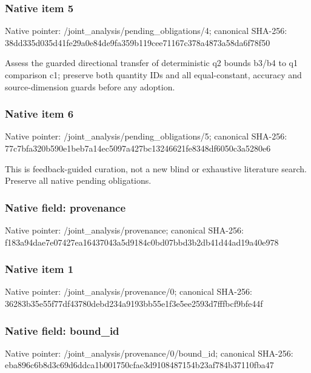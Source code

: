 \documentclass[10pt,a4paper]{article}
\begin{document}
\subsubsection{Native item 5}
Native pointer: /joint\_\allowbreak{}analysis/pending\_\allowbreak{}obligations/4; canonical SHA-256: 38dd335d035d41fe29a0e84de9fa359b119cee71167c378a4873a58da6f78f50

\begingroup\raggedright\sloppy Assess the guarded directional transfer of deterministic q2 bounds b3/\allowbreak{}b4 to q1 comparison c1;\allowbreak{} preserve both quantity IDs and all equal-constant,\allowbreak{} accuracy and source-dimension guards before any adoption.\par\endgroup

\subsubsection{Native item 6}
Native pointer: /joint\_\allowbreak{}analysis/pending\_\allowbreak{}obligations/5; canonical SHA-256: 77c7bfa320b590e1beb7a14ec5097a427bc13246621fe8348df6050c3a5280e6

\begingroup\raggedright\sloppy This is feedback-guided curation,\allowbreak{} not a new blind or exhaustive literature search. Preserve all native pending obligations.\par\endgroup

\subsubsection{Native field: provenance}
Native pointer: /joint\_\allowbreak{}analysis/provenance; canonical SHA-256: f183a94dae7e07427ea16437043a5d9184c0bd07bbd3b2db41d44ad19a40e978

\subsubsection{Native item 1}
Native pointer: /joint\_\allowbreak{}analysis/provenance/0; canonical SHA-256: 36283b35e55f77df43780debd234a9193bb55e1f3e5ee2593d7fffbcf9bfe44f

\subsubsection{Native field: bound\_\allowbreak{}id}
Native pointer: /joint\_\allowbreak{}analysis/provenance/0/bound\_\allowbreak{}id; canonical SHA-256: eba896c6b8d3c69d6ddca1b001750cfae3d9108487154b23af784b37110fba47
\end{document}
